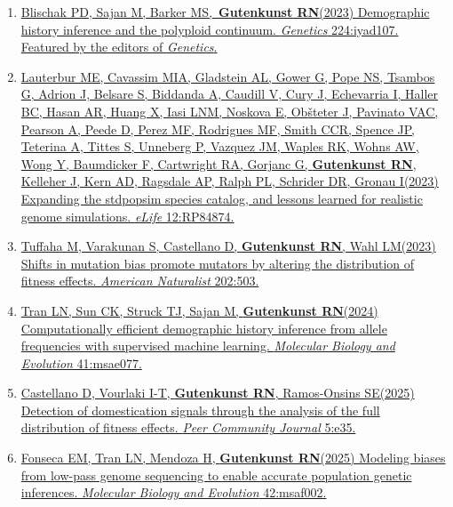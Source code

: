 \documentclass[11pt]{article}
\begin{document}
\begin{enumerate}
\item \href{https://doi.org/10.1093/genetics/iyad107}{Blischak PD\trainee\corresponding, Sajan M\trainee, Barker MS, \textbf{Gutenkunst RN}\corresponding (2023) Demographic history inference and the polyploid continuum. \emph{Genetics} 224:iyad107.}\\
 \href{https://academic.oup.com/genetics/issue/224/4}{Featured by the editors of \emph{Genetics}.}

\item \href{https://doi.org/10.7554/eLife.84874}{Lauterbur ME\equal, Cavassim MIA\equal, Gladstein AL\equal, Gower G\equal, Pope NS\equal, Tsambos G\equal, Adrion J, Belsare S, Biddanda A, Caudill V, Cury J, Echevarria I, Haller BC, Hasan AR, Huang X, Iasi LNM, Noskova E, Ob{\v s}teter J, Pavinato VAC, Pearson A, Peede D, Perez MF, Rodrigues MF, Smith CCR, Spence JP, Teterina A, Tittes S, Unneberg P, Vazquez JM, Waples RK, Wohns AW, Wong Y, Baumdicker F, Cartwright RA, Gorjanc G, \textbf{Gutenkunst RN}, Kelleher J, Kern AD, Ragsdale AP, Ralph PL, Schrider DR, Gronau I\corresponding (2023) Expanding the stdpopsim species catalog, and lessons learned for realistic genome simulations. \emph{eLife} 12:RP84874.}

\item \href{https://doi.org/10.1086/726010}{Tuffaha M, Varakunan S, Castellano D\trainee, \textbf{Gutenkunst RN}, Wahl LM\corresponding (2023) Shifts in mutation bias promote mutators by altering the distribution of fitness effects. \emph{American Naturalist} 202:503.}

\item \href{https://doi.org/10.1093/molbev/msae077}{Tran LN\trainee, Sun CK\trainee, Struck TJ\trainee, Sajan M\trainee, \textbf{Gutenkunst RN}\corresponding (2024) Computationally efficient demographic history inference from allele frequencies with supervised machine learning. \emph{Molecular Biology and Evolution} 41:msae077.}

\item \href{https://doi.org/10.24072/pcjournal.540}{Castellano D\trainee\equal, Vourlaki I-T\equal, \textbf{Gutenkunst RN}\corresponding, Ramos-Onsins SE\corresponding (2025) Detection of domestication signals through the analysis of the full distribution of fitness effects. \emph{Peer Community Journal} 5:e35.}

\item \href{https://doi.org/10.1093/molbev/msaf002}{Fonseca EM\trainee\corresponding, Tran LN\trainee, Mendoza H\trainee, \textbf{Gutenkunst RN}\corresponding (2025) Modeling biases from low-pass genome sequencing to enable accurate population genetic inferences. \emph{Molecular Biology and Evolution} 42:msaf002.}


\end{enumerate}
\end{document}
